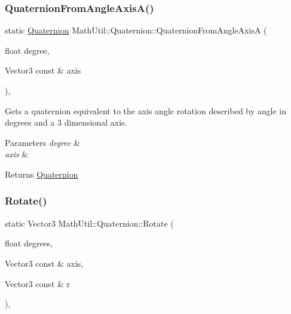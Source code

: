 \subsubsection{\texorpdfstring{Quaternion\+From\+Angle\+Axis\+A()}{QuaternionFromAngleAxisA()}}
{\footnotesize\ttfamily static \hyperlink{structMathUtil_1_1Quaternion}{Quaternion} Math\+Util\+::\+Quaternion\+::\+Quaternion\+From\+Angle\+AxisA (\begin{DoxyParamCaption}\item[{float}]{degree,  }\item[{Vector3 const \&}]{axis }\end{DoxyParamCaption})\hspace{0.3cm}{\ttfamily [inline]}, {\ttfamily [static]}}



Gets a quaternion equivalent to the axis angle rotation described by angle in degrees and a 3 dimensional axis. 


\begin{DoxyParams}{Parameters}
{\em degree} & \\
\hline
{\em axis} & \\
\hline
\end{DoxyParams}
\begin{DoxyReturn}{Returns}
\hyperlink{structMathUtil_1_1Quaternion}{Quaternion} 
\end{DoxyReturn}
\mbox{\label{structMathUtil_1_1Quaternion_abbc1484b797a8677a99cbe9c3947f7a9}} 
\subsubsection{\texorpdfstring{Rotate()}{Rotate()}\hspace{0.1cm}{\footnotesize\ttfamily [1/2]}}
{\footnotesize\ttfamily static Vector3 Math\+Util\+::\+Quaternion\+::\+Rotate (\begin{DoxyParamCaption}\item[{float}]{degrees,  }\item[{Vector3 const \&}]{axis,  }\item[{Vector3 const \&}]{r }\end{DoxyParamCaption})\hspace{0.3cm}{\ttfamily [inline]}, {\ttfamily [static]}}




